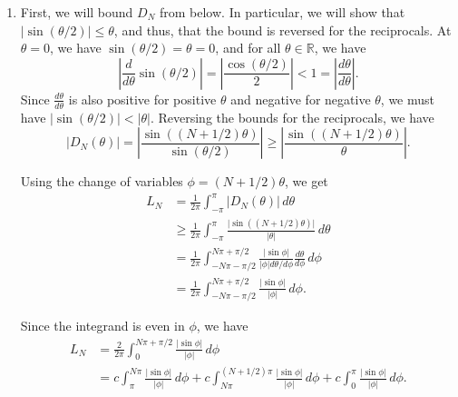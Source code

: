 \documentclass[12 pt, letterpaper]{hmcpset}
\begin{document}
\begin{solution}
	\begin{enumerate}
		\item First, we will bound $D_{N}$ from below. In particular, we will show that $\lvert \sin{(\theta / 2)} \rvert \le \theta$, and thus, that the bound is reversed for the reciprocals. At $\theta = 0$, we have $\sin{(\theta / 2)} = \theta = 0$, and for all $\theta \in \mathbb{R}$, we have
			\[
				\left \lvert \frac{d}{d \theta} \sin{(\theta / 2)} \right \rvert = \left \lvert \frac{\cos{(\theta / 2)}}{2} \right \rvert < 1 = \left \lvert \frac{d \theta}{d \theta} \right \rvert.
			\]
			Since $\frac{d \theta}{d \theta}$ is also positive for positive $\theta$ and negative for negative $\theta$, we must have $\lvert \sin{(\theta / 2)} \rvert < \lvert \theta \rvert$. Reversing the bounds for the reciprocals, we have
			\[
				\lvert D_{N}(\theta) \rvert = \left \lvert \frac{\sin{((N + 1/2) \theta)}}{ \sin{(\theta / 2)} } \right \rvert \ge \left \lvert \frac{\sin{((N + 1 /2) \theta)}}{\theta} \right \rvert.
			\]

			Using the change of variables $\phi = (N + 1/2) \theta$, we get
			\begin{align*}
				L_{N} & = \frac{1}{2 \pi} \int_{-\pi}^{\pi} \lvert D_{N}(\theta) \rvert \, d\theta \\
				      & \ge \frac{1}{2 \pi} \int_{-\pi}^{\pi} \frac{\lvert \sin{((N + 1/2) \theta)} \rvert}{\lvert \theta \rvert} \, d\theta \\
				      & = \frac{1}{2 \pi} \int_{-N \pi - \pi/2}^{N \pi + \pi/2} \frac{\lvert \sin{\phi} \rvert}{\lvert \phi \rvert d \theta / d \phi} \frac{d \theta}{d \phi} \, d\phi \\
				      & = \frac{1}{2 \pi} \int_{-N \pi - \pi /2}^{N \pi + \pi/2} \frac{\lvert \sin{\phi} \rvert}{\lvert \phi \rvert} \, d\phi.
			\end{align*}

			Since the integrand is even in $\phi$, we have
			\begin{align*}
				L_{N} & = \frac{2}{2 \pi} \int_{0}^{N \pi + \pi/2} \frac{\lvert \sin{\phi} \rvert}{\lvert \phi \rvert} \, d \phi \\
				      & = c \int_{\pi}^{N \pi} \frac{\lvert \sin{\phi} \rvert}{\lvert \phi \rvert} \, d \phi + c \int_{N \pi}^{(N + 1/2) \pi} \frac{\lvert \sin{\phi} \rvert}{\lvert \phi \rvert} \, d \phi + c \int_{0}^{\pi} \frac{\lvert \sin{\phi} \rvert}{\lvert \phi \rvert} \, d \phi.
			\end{align*}


\end{enumerate}
\end{solution}
\end{document}
